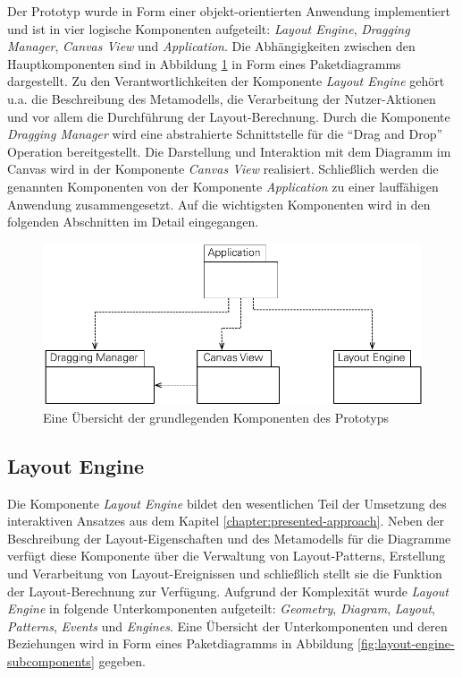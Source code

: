 Der Prototyp wurde in Form einer objekt-orientierten Anwendung implementiert und ist in vier logische Komponenten aufgeteilt: \textit{Layout Engine}, \textit{Dragging Manager}, \textit{Canvas View} und \textit{Application}. Die Abhängigkeiten zwischen den Hauptkomponenten sind in Abbildung \ref{fig:main-components} in Form eines Paketdiagramms dargestellt. Zu den Verantwortlichkeiten der Komponente \textit{Layout Engine} gehört u.a. die Beschreibung des Metamodells, die Verarbeitung der Nutzer-Aktionen und vor allem die Durchführung der Layout-Berechnung. Durch die Komponente \textit{Dragging Manager} wird eine abstrahierte Schnittstelle für die \enquote{Drag and Drop} Operation bereitgestellt. Die Darstellung und Interaktion mit dem Diagramm im Canvas wird in der Komponente \textit{Canvas View} realisiert. Schließlich werden die genannten Komponenten von der Komponente \textit{Application} zu einer lauffähigen Anwendung zusammengesetzt. Auf die wichtigsten Komponenten wird in den folgenden Abschnitten im Detail eingegangen.

\begin{figure}[hbt]
    \centering
    \includegraphics[scale=0.85]{assets/main-components}
    \caption{Eine Übersicht der grundlegenden Komponenten des Prototyps}
    \label{fig:main-components}
\end{figure}

\subsection{Layout Engine}

Die Komponente \textit{Layout Engine} bildet den wesentlichen Teil der Umsetzung des interaktiven Ansatzes aus dem Kapitel \ref{chapter:presented-approach}. Neben der Beschreibung der Layout-Eigenschaften und des Metamodells für die Diagramme verfügt diese Komponente über die Verwaltung von Layout-Patterns, Erstellung und Verarbeitung von Layout-Ereignissen und schließlich stellt sie die Funktion der Layout-Berechnung zur Verfügung. Aufgrund der Komplexität wurde \textit{Layout Engine} in folgende Unterkomponenten aufgeteilt: \textit{Geometry}, \textit{Diagram}, \textit{Layout}, \textit{Patterns}, \textit{Events} und \textit{Engines}. Eine Übersicht der Unterkomponenten und deren Beziehungen wird in Form eines Paketdiagramms in Abbildung \ref{fig:layout-engine-subcomponents} gegeben.

